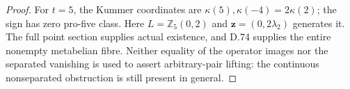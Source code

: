 \begin{proof}
For \(t=5\), the Kummer coordinates are
\(\kappa(5),\kappa(-4)=2\kappa(2)\); the sign has zero
pro-five class. Here \(L=\mathbb Z_5(0,2)\) and
\(\mathbf z=(0,2\lambda_2)\) generates it. The full point
section supplies actual existence, and D.74 supplies
the entire nonempty metabelian fibre. Neither equality
of the operator images nor the separated vanishing is
used to assert arbitrary-pair lifting: the continuous
nonseparated obstruction is still present in general.
\end{proof}

